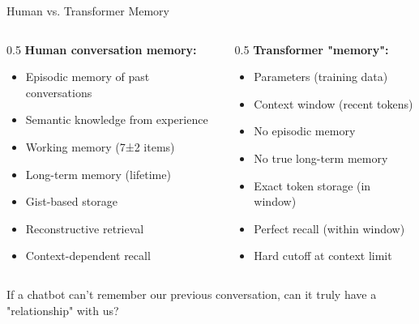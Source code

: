 \documentclass[aspectratio=169]{beamer}
\begin{document}
\begin{frame}[shrink=10]{Human vs. Transformer Memory 🔄}
\small
    \begin{columns}[T]
        \begin{column}{0.5\textwidth}
            \textbf{Human conversation memory:}
            \begin{itemize}\setlength{\itemsep}{0pt}
                \item Episodic memory of past conversations
                \item Semantic knowledge from experience
                \item Working memory (7±2 items)
                \item Long-term memory (lifetime)
                \item Gist-based storage
                \item Reconstructive retrieval
                \item Context-dependent recall
            \end{itemize}
        \end{column}

        \begin{column}{0.5\textwidth}
            \textbf{Transformer "memory":}
            \begin{itemize}\setlength{\itemsep}{0pt}
                \item Parameters (training data)
                \item Context window (recent tokens)
                \item No episodic memory
                \item No true long-term memory
                \item Exact token storage (in window)
                \item Perfect recall (within window)
                \item Hard cutoff at context limit
            \end{itemize}
        \end{column}
    \end{columns}

    \vspace{0.3cm}

    \begin{discussion}
        If a chatbot can't remember our previous conversation, can it truly have a "relationship" with us?
    \end{discussion}
\end{frame}
\end{document}
